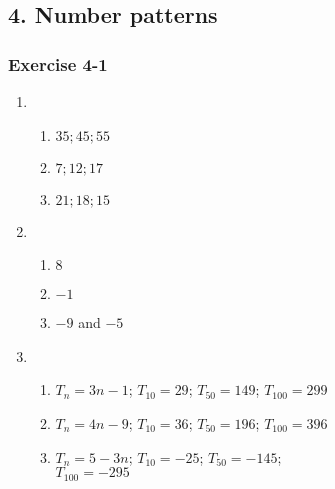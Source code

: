 {%
\subsection* {4. Number patterns}
\begin{multicols}{3}
\subsubsection*{Exercise 4-1} %

\begin{enumerate}[noitemsep, label=\textbf{\arabic*}. ] 
\item %

  \begin{enumerate} [noitemsep, label=\textbf{(\alph*)} ]
  \item $35; 45; 55$ %
  \item $7; 12; 17$%
  \item $21; 18; 15$%
  \end{enumerate}
 \item %
  \begin{enumerate} [noitemsep, label=\textbf{(\alph*)} ]
  \item $8$%
  \item $-1$%
  \item $-9$ and $-5$%
  \end{enumerate}
     
\item %
  \begin{enumerate}[noitemsep, label=\textbf{(\alph*)} ]
  \item $T_n=3n-1$; $T_{10}=29$; $T_{50}=149$; $T_{100}=299$%
  \item $T_n=4n-9$; $T_{10}=36$; $T_{50}=196$; $T_{100}=396$%
  \item $T_n=5-3n$; $T_{10}=-25$; $T_{50}=-145$;\\ $T_{100}=-295$%
  \end{enumerate}
\end{enumerate}


\end{multicols}}
